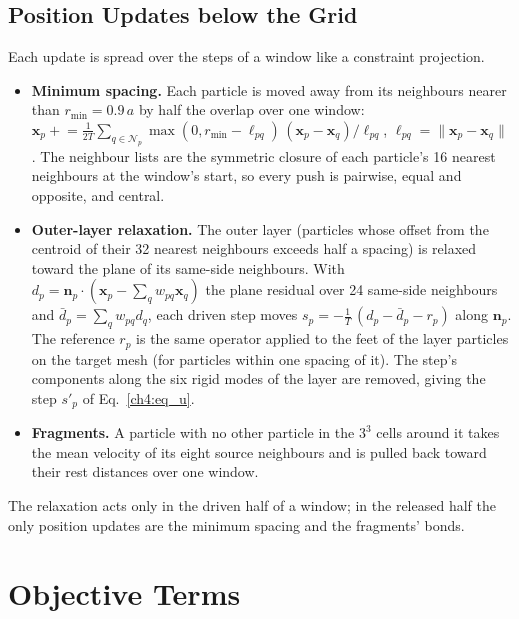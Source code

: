 \subsection{Position Updates below the Grid}
\label{ch4:sec_below_grid}
Each update is spread over the steps of a window like a constraint projection.
\begin{itemize}
  \item \textbf{Minimum spacing.} Each particle is moved away from its neighbours nearer than $r_{\min}=0.9\,a$ by half
        the overlap over one window:
        $\mathbf{x}_p\mathrel{+}=\tfrac{1}{2T}\sum_{q\in\mathcal{N}_p}\max(0,r_{\min}-\ell_{pq})\,
        (\mathbf{x}_p-\mathbf{x}_q)/\ell_{pq}$, $\ell_{pq}=\lVert\mathbf{x}_p-\mathbf{x}_q\rVert$. The neighbour lists are
        the symmetric closure of each particle's 16 nearest neighbours at the window's start, so every push is pairwise,
        equal and opposite, and central.
  \item \textbf{Outer-layer relaxation.} The outer layer (particles whose offset from the centroid of their 32 nearest
        neighbours exceeds half a spacing) is relaxed toward the plane of its same-side neighbours. With
        $d_p=\mathbf{n}_p\cdot(\mathbf{x}_p-\sum_q w_{pq}\mathbf{x}_q)$ the plane residual over 24 same-side neighbours and
        $\bar d_p=\sum_q w_{pq}d_q$, each driven step moves $s_p=-\tfrac{1}{T}\,(d_p-\bar d_p-r_p)$ along $\mathbf{n}_p$. The
        reference $r_p$ is the same operator applied to the feet of the layer particles on the target mesh (for particles
        within one spacing of it). The step's components along the six rigid modes of the layer are removed, giving the
        step $s'_p$ of Eq.~\eqref{ch4:eq_u}.
  \item \textbf{Fragments.} A particle with no other particle in the $3^3$ cells around it takes the mean velocity of its
        eight source neighbours and is pulled back toward their rest distances over one window.
\end{itemize}
The relaxation acts only in the driven half of a window; in the released half the only position updates are the minimum
spacing and the fragments' bonds.

\section{Objective Terms}
\label{app:ch4_terms}

